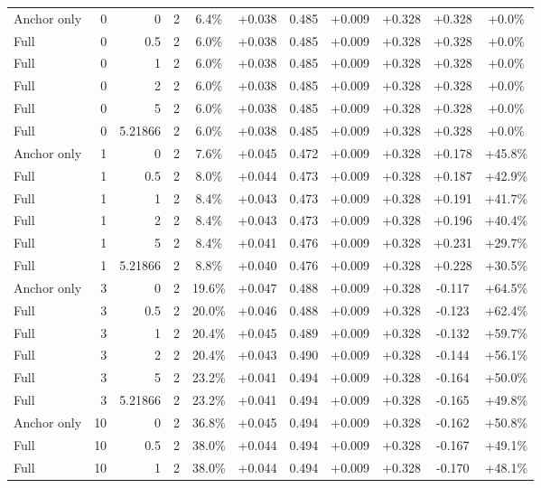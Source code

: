 \begin{table}[htbp]
\begin{tabular}{lrrrccccccc}
Anchor only & 0 & 0 & 2 & 6.4\% & +0.038 & 0.485 & +0.009 & +0.328 & +0.328 & +0.0\% \\
Full & 0 & 0.5 & 2 & 6.0\% & +0.038 & 0.485 & +0.009 & +0.328 & +0.328 & +0.0\% \\
Full & 0 & 1 & 2 & 6.0\% & +0.038 & 0.485 & +0.009 & +0.328 & +0.328 & +0.0\% \\
Full & 0 & 2 & 2 & 6.0\% & +0.038 & 0.485 & +0.009 & +0.328 & +0.328 & +0.0\% \\
Full & 0 & 5 & 2 & 6.0\% & +0.038 & 0.485 & +0.009 & +0.328 & +0.328 & +0.0\% \\
Full & 0 & 5.21866 & 2 & 6.0\% & +0.038 & 0.485 & +0.009 & +0.328 & +0.328 & +0.0\% \\
Anchor only & 1 & 0 & 2 & 7.6\% & +0.045 & 0.472 & +0.009 & +0.328 & +0.178 & +45.8\% \\
Full & 1 & 0.5 & 2 & 8.0\% & +0.044 & 0.473 & +0.009 & +0.328 & +0.187 & +42.9\% \\
Full & 1 & 1 & 2 & 8.4\% & +0.043 & 0.473 & +0.009 & +0.328 & +0.191 & +41.7\% \\
Full & 1 & 2 & 2 & 8.4\% & +0.043 & 0.473 & +0.009 & +0.328 & +0.196 & +40.4\% \\
Full & 1 & 5 & 2 & 8.4\% & +0.041 & 0.476 & +0.009 & +0.328 & +0.231 & +29.7\% \\
Full & 1 & 5.21866 & 2 & 8.8\% & +0.040 & 0.476 & +0.009 & +0.328 & +0.228 & +30.5\% \\
Anchor only & 3 & 0 & 2 & 19.6\% & +0.047 & 0.488 & +0.009 & +0.328 & -0.117 & +64.5\% \\
Full & 3 & 0.5 & 2 & 20.0\% & +0.046 & 0.488 & +0.009 & +0.328 & -0.123 & +62.4\% \\
Full & 3 & 1 & 2 & 20.4\% & +0.045 & 0.489 & +0.009 & +0.328 & -0.132 & +59.7\% \\
Full & 3 & 2 & 2 & 20.4\% & +0.043 & 0.490 & +0.009 & +0.328 & -0.144 & +56.1\% \\
Full & 3 & 5 & 2 & 23.2\% & +0.041 & 0.494 & +0.009 & +0.328 & -0.164 & +50.0\% \\
Full & 3 & 5.21866 & 2 & 23.2\% & +0.041 & 0.494 & +0.009 & +0.328 & -0.165 & +49.8\% \\
Anchor only & 10 & 0 & 2 & 36.8\% & +0.045 & 0.494 & +0.009 & +0.328 & -0.162 & +50.8\% \\
Full & 10 & 0.5 & 2 & 38.0\% & +0.044 & 0.494 & +0.009 & +0.328 & -0.167 & +49.1\% \\
Full & 10 & 1 & 2 & 38.0\% & +0.044 & 0.494 & +0.009 & +0.328 & -0.170 & +48.1\% \\

\end{tabular}
\end{table}
